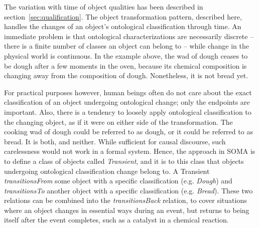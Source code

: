 The variation with time of object qualities has been described in section~\ref{sec:qualification}. The object transformation pattern, described here, handles the changes of an object's ontological classification through time. An immediate problem is that ontological characterizations are necessarily discrete -- there is a finite number of classes an object can belong to -- while change in the physical world is continuous. In the example above, the wad of dough ceases to be dough after a few moments in the oven, because its chemical composition is changing away from the composition of dough. Nonetheless, it is not bread yet.

For practical purposes however, human beings often do not care about the exact classification of an object undergoing ontological change; only the endpoints are important. Also, there is a tendency to loosely apply ontological classification to the changing object, as if it were on either side of the transformation. The cooking wad of dough could be referred to as dough, or it could be referred to as bread. It is both, and neither. While sufficient for causal discourse, such carelessness would not work in a formal system. Hence, the approach in SOMA is to define a class of objects called \emph{Transient}, and it is to this class that objects undergoing ontological classification change belong to. A Transient \emph{transitionsFrom} some object with a specific classification (e.g. \emph{Dough}) and \emph{transitionsTo} another object with a specific classification (e.g. \emph{Bread}). These two relations can be combined into the \emph{transitionsBack} relation, to cover situations where an object changes in essential ways during an event, but returns to being itself after the event completes, such as a catalyst in a chemical reaction.
 

